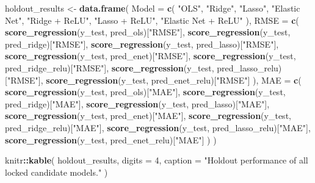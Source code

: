 \documentclass[
  11pt,
]{article}
\newenvironment{Shaded}{\begin{snugshade}}{\end{snugshade}}
\newcommand{\AttributeTok}[1]{\textcolor[rgb]{0.13,0.29,0.53}{#1}}
\newcommand{\DecValTok}[1]{\textcolor[rgb]{0.00,0.00,0.81}{#1}}
\newcommand{\FunctionTok}[1]{\textcolor[rgb]{0.13,0.29,0.53}{\textbf{#1}}}
\newcommand{\NormalTok}[1]{#1}
\newcommand{\OtherTok}[1]{\textcolor[rgb]{0.56,0.35,0.01}{#1}}
\newcommand{\SpecialCharTok}[1]{\textcolor[rgb]{0.81,0.36,0.00}{\textbf{#1}}}
\newcommand{\StringTok}[1]{\textcolor[rgb]{0.31,0.60,0.02}{#1}}
\begin{document}
\begin{Shaded}
\begin{Highlighting}[]
\NormalTok{holdout\_results }\OtherTok{\textless{}{-}} \FunctionTok{data.frame}\NormalTok{(}
  \AttributeTok{Model =} \FunctionTok{c}\NormalTok{(}
    \StringTok{"OLS"}\NormalTok{,}
    \StringTok{"Ridge"}\NormalTok{,}
    \StringTok{"Lasso"}\NormalTok{,}
    \StringTok{"Elastic Net"}\NormalTok{,}
    \StringTok{"Ridge + ReLU"}\NormalTok{,}
    \StringTok{"Lasso + ReLU"}\NormalTok{,}
    \StringTok{"Elastic Net + ReLU"}
\NormalTok{  ),}
  \AttributeTok{RMSE =} \FunctionTok{c}\NormalTok{(}
    \FunctionTok{score\_regression}\NormalTok{(y\_test, pred\_ols)[}\StringTok{"RMSE"}\NormalTok{],}
    \FunctionTok{score\_regression}\NormalTok{(y\_test, pred\_ridge)[}\StringTok{"RMSE"}\NormalTok{],}
    \FunctionTok{score\_regression}\NormalTok{(y\_test, pred\_lasso)[}\StringTok{"RMSE"}\NormalTok{],}
    \FunctionTok{score\_regression}\NormalTok{(y\_test, pred\_enet)[}\StringTok{"RMSE"}\NormalTok{],}
    \FunctionTok{score\_regression}\NormalTok{(y\_test, pred\_ridge\_relu)[}\StringTok{"RMSE"}\NormalTok{],}
    \FunctionTok{score\_regression}\NormalTok{(y\_test, pred\_lasso\_relu)[}\StringTok{"RMSE"}\NormalTok{],}
    \FunctionTok{score\_regression}\NormalTok{(y\_test, pred\_enet\_relu)[}\StringTok{"RMSE"}\NormalTok{]}
\NormalTok{  ),}
  \AttributeTok{MAE =} \FunctionTok{c}\NormalTok{(}
    \FunctionTok{score\_regression}\NormalTok{(y\_test, pred\_ols)[}\StringTok{"MAE"}\NormalTok{],}
    \FunctionTok{score\_regression}\NormalTok{(y\_test, pred\_ridge)[}\StringTok{"MAE"}\NormalTok{],}
    \FunctionTok{score\_regression}\NormalTok{(y\_test, pred\_lasso)[}\StringTok{"MAE"}\NormalTok{],}
    \FunctionTok{score\_regression}\NormalTok{(y\_test, pred\_enet)[}\StringTok{"MAE"}\NormalTok{],}
    \FunctionTok{score\_regression}\NormalTok{(y\_test, pred\_ridge\_relu)[}\StringTok{"MAE"}\NormalTok{],}
    \FunctionTok{score\_regression}\NormalTok{(y\_test, pred\_lasso\_relu)[}\StringTok{"MAE"}\NormalTok{],}
    \FunctionTok{score\_regression}\NormalTok{(y\_test, pred\_enet\_relu)[}\StringTok{"MAE"}\NormalTok{]}
\NormalTok{  )}
\NormalTok{)}

\NormalTok{knitr}\SpecialCharTok{::}\FunctionTok{kable}\NormalTok{(}
\NormalTok{  holdout\_results,}
  \AttributeTok{digits =} \DecValTok{4}\NormalTok{,}
  \AttributeTok{caption =} \StringTok{"Holdout performance of all locked candidate models."}
\NormalTok{)}
\end{Highlighting}
\end{Shaded}
\end{document}
